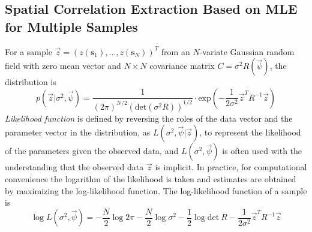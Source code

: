 \documentclass[referee]{ieice}
\begin{document}
\subsection{Spatial Correlation Extraction Based on MLE for Multiple Samples}
For a sample $\vec{z}=(z(\mathbf{s}_1),\ldots,z(\mathbf{s}_N))^T$ from an $N$-variate Gaussian
random field with zero mean vector and $N \times N$ covariance matrix $C=\sigma^2 R(\vec{\psi})$,
the distribution is
\begin{equation}
p(\vec{z}|\sigma^2,\vec{\psi})=\frac{1}{(2\pi)^{N/2}(\mathrm{det}(\sigma^2 R))^{1/2}} \cdot \mathrm{exp}\left(-\frac{1}{2\sigma^2}\vec{z}^T R^{-1}\vec{z} \right)
\end{equation}
{\it Likelihood function} is defined by reversing the roles of the data vector and the parameter vector in the
distribution, as $L(\sigma^2,\vec{\psi}|\vec{z})$, to represent the likelihood of the parameters
given the observed data, and $L(\sigma^2,\vec{\psi})$ is often used with the understanding
that the observed data $\vec{z}$ is implicit.
In practice, for computational convenience the logarithm of the likelihood is taken and estimates
are obtained by maximizing the log-likelihood function.
The log-likelihood function of a sample is
\begin{equation} \label{eqn:likhood_uni}
\log L(\sigma^2,\vec{\psi}) = -\frac{N}{2}\log 2\pi-\frac{N}{2}\log \sigma^2-\frac{1}{2}\log \mathrm{det}~R-\frac{1}{2\sigma^2}\vec{z}^T R^{-1}\vec{z}
\end{equation}
\end{document}
